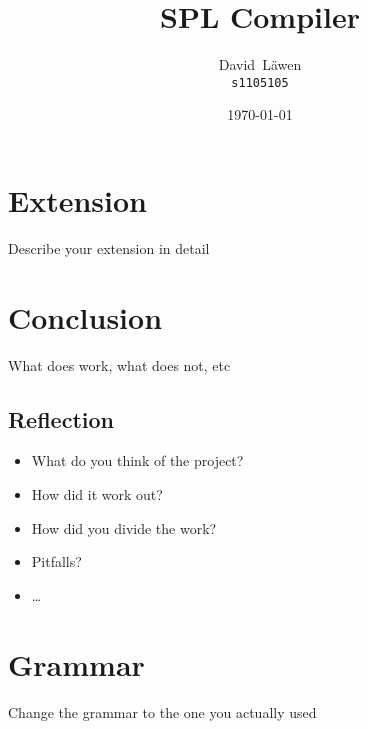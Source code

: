 \documentclass{report}
\author{%
	David~L\"awen\\
	\small\texttt{s1105105}
}
\date{\today}
\title{SPL Compiler}
\begin{document}
\maketitle%

\tableofcontents%










\chapter{Extension} \label{chp:extension}
Describe your extension in detail

\chapter{Conclusion} \label{chp:conclusion}
What does work, what does not, etc

\section{Reflection} \label{chp:reflection}
\begin{itemize}
	\item What do you think of the project?
	\item How did it work out?
	\item How did you divide the work?
	\item Pitfalls?
	\item \ldots
\end{itemize}




\appendix
\chapter{Grammar} \label{chp:grammar}
Change the grammar to the one you actually used
\end{document}
